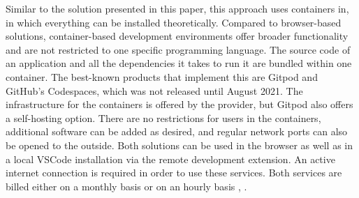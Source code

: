     Similar to the solution presented in this paper, this approach uses containers in, in which everything can be installed theoretically. Compared to browser-based solutions, container-based development environments offer broader functionality and are not restricted to one specific programming language. The source code of an application and all the dependencies it takes to run it are bundled within one container. The best-known products that implement this are Gitpod and GitHub's Codespaces, which was not released until August 2021. The infrastructure for the containers is offered by the provider, but Gitpod also offers a self-hosting option. There are no restrictions for users in the containers, additional software can be added as desired, and regular network ports can also be opened to the outside. Both solutions can be used in the browser as well as in a local \ac{VSCode} installation via the remote development extension. An active internet connection is required in order to use these services. Both services are billed either on a monthly basis or on an hourly basis \cite{githubcodespace}, \cite{gitpod}.
